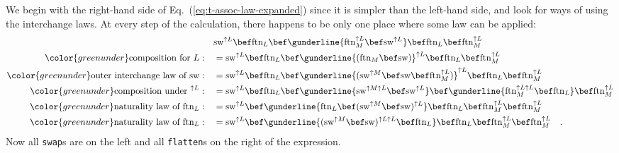 We begin with the right-hand side of Eq.~(\ref{eq:t-assoc-law-expanded})
since it is simpler than the left-hand side, and look for ways of
using the interchange laws. At every step of the calculation, there
happens to be only one place where some law can be applied:
\begin{align*}
 & \text{sw}^{\uparrow L}\bef\text{ftn}_{L}\bef\gunderline{\text{ftn}_{M}^{\uparrow L}\bef\text{sw}^{\uparrow L}}\bef\text{ftn}_{L}\bef\text{ftn}_{M}^{\uparrow L}\\
{\color{greenunder}\text{composition for }L:}\quad & =\text{sw}^{\uparrow L}\bef\text{ftn}_{L}\bef\gunderline{(\text{ftn}_{M}\bef\text{sw})}^{\uparrow L}\bef\text{ftn}_{L}\bef\text{ftn}_{M}^{\uparrow L}\\
{\color{greenunder}\text{outer interchange law of }\text{sw}:}\quad & =\text{sw}^{\uparrow L}\bef\text{ftn}_{L}\bef\gunderline{(\text{sw}^{\uparrow M}\bef\text{sw}\bef\text{ftn}_{M}^{\uparrow L})}^{\uparrow L}\bef\text{ftn}_{L}\bef\text{ftn}_{M}^{\uparrow L}\\
{\color{greenunder}\text{composition under }^{\uparrow L}:}\quad & =\text{sw}^{\uparrow L}\bef\text{ftn}_{L}\bef\gunderline{\text{sw}^{\uparrow M\uparrow L}\bef\text{sw}^{\uparrow L}}\bef\gunderline{\text{ftn}_{M}^{\uparrow L\uparrow L}\bef\text{ftn}_{L}}\bef\text{ftn}_{M}^{\uparrow L}\\
{\color{greenunder}\text{naturality law of }\text{ftn}_{L}:}\quad & =\text{sw}^{\uparrow L}\bef\gunderline{\text{ftn}_{L}\bef(\text{sw}^{\uparrow M}\bef\text{sw})^{\uparrow L}}\bef\text{ftn}_{L}\bef\text{ftn}_{M}^{\uparrow L}\bef\text{ftn}_{M}^{\uparrow L}\\
{\color{greenunder}\text{naturality law of }\text{ftn}_{L}:}\quad & =\text{sw}^{\uparrow L}\bef\gunderline{(\text{sw}^{\uparrow M}\bef\text{sw})^{\uparrow L\uparrow L}\bef\text{ftn}_{L}}\bef\text{ftn}_{L}\bef\text{ftn}_{M}^{\uparrow L}\bef\text{ftn}_{M}^{\uparrow L}\quad.
\end{align*}
Now all \lstinline!swap!s are on the left and all \lstinline!flatten!s
on the right of the expression.

